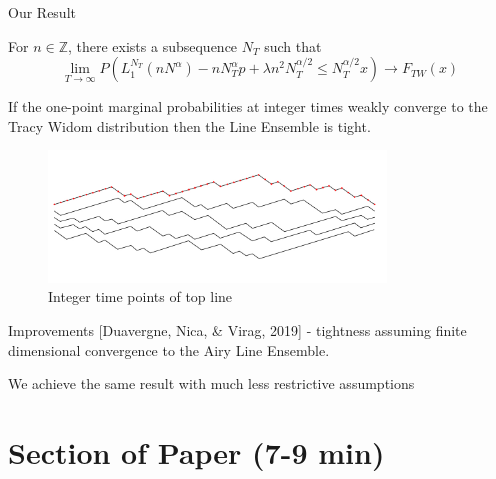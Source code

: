 \documentclass[9pt,t,dvipsnames]{beamer}
\begin{document}
\begin{frame}{Our Result}
\begin{theorem}For $n\in \mathbb{Z}$, there exists a subsequence $N_T$ such that
\[\lim_{T\to\infty}P(L_1^{N_T}(nN^{\alpha}) - nN_T^{\alpha} p + \lambda n^2 N_T^{\alpha/2} \leq N_T^{\alpha/2} x) \to F_{TW}(x)\]
\end{theorem}
If the one-point marginal probabilities at integer times weakly converge to the Tracy Widom distribution then the Line Ensemble is tight.
\begin{figure}
	\includegraphics[width=0.8\textwidth]{graphics/ConvToTW.jpg}
	\caption{Integer time points of top line}
\end{figure}
\end{frame}

\begin{frame}{Improvements}
[Duavergne, Nica, \& Virag, 2019] - tightness assuming finite dimensional convergence to the Airy Line Ensemble. 

We achieve the same result with much less restrictive assumptions
\newline\newline{}
\end{frame}


\section{Section of Paper (7-9 min)}
\end{document}
